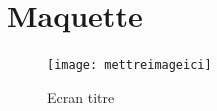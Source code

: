 \documentclass[12pt,a4paper]{article}
\begin{document}
    
    
    \newpage
	\section{Maquette}
	    
    	\begin{figure}[htbp]
            \center
            \texttt{[image: mettreimageici]}
            \caption{Ecran titre}
		\end{figure}
		

    
    
\end{document}
